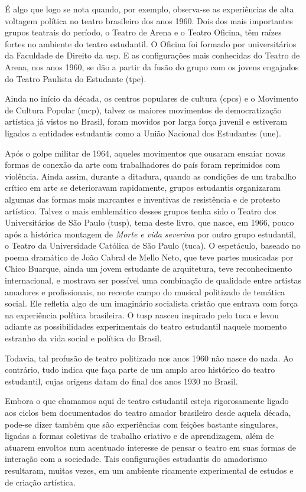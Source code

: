 É algo que logo se nota quando, por exemplo, observa-se as experiências
de alta voltagem política no teatro brasileiro dos anos 1960. Dois dos
mais importantes grupos teatrais do período, o Teatro de Arena e o
Teatro Oficina, têm raízes fortes no ambiente do teatro estudantil. O
Oficina foi formado por universitários da Faculdade de Direito da {\sc usp}. E
as configurações mais conhecidas do Teatro de Arena, nos anos 1960, se
dão a partir da fusão do grupo com os jovens engajados do Teatro
Paulista do Estudante ({\sc tpe}).

Ainda no início da década, os centros populares de cultura ({\sc cpc}s) e o
Movimento de Cultura Popular ({\sc mcp}), talvez os maiores movimentos de
democratização artística já vistos no Brasil, foram movidos por larga
força juvenil e estiveram ligados a entidades estudantis como a União
Nacional dos Estudantes ({\sc une}).

Após o golpe militar de 1964, aqueles movimentos que ousaram ensaiar
novas formas de conexão da arte com trabalhadores do país foram
reprimidos com violência. Ainda assim, durante a ditadura, quando as
condições de um trabalho crítico em arte se deterioravam rapidamente,
grupos estudantis organizaram algumas das formas mais marcantes e
inventivas de resistência e de protesto artístico. Talvez o mais
emblemático desses grupos tenha sido o Teatro dos Universitários de São
Paulo ({\sc tusp}), tema deste livro, que nasce, em 1966, pouco após a
histórica montagem de {\it Morte e vida severina} por outro grupo
estudantil, o Teatro da Universidade Católica de São Paulo ({\sc tuca}). O
espetáculo, baseado no poema dramático de João Cabral de Mello Neto, que
teve partes musicadas por Chico Buarque, ainda um jovem estudante de
arquitetura, teve reconhecimento internacional, e mostrava ser possível
uma combinação de qualidade entre artistas amadores e profissionais, no
recente campo do musical politizado de temática social. Ele refletia
algo de um imaginário socialista cristão que entrava com força na
experiência política brasileira. O {\sc tusp} nasceu inspirado pelo {\sc tuca} e
levou adiante as possibilidades experimentais do teatro estudantil
naquele momento estranho da vida social e política do Brasil.

Todavia, tal profusão de teatro politizado nos anos 1960 não nasce do
nada. Ao contrário, tudo indica que faça parte de um amplo arco
histórico do teatro estudantil, cujas origens datam do final dos anos
1930 no Brasil.

Embora o que chamamos aqui de teatro estudantil esteja rigorosamente
ligado aos ciclos bem documentados do teatro amador brasileiro desde
aquela década, pode-se dizer também que são experiências com feições
bastante singulares, ligadas a formas coletivas de trabalho criativo e
de aprendizagem, além de atuarem envoltos num acentuado interesse de
pensar o teatro em suas formas de interação com a sociedade. Tais
configurações estudantis do amadorismo resultaram, muitas vezes, em um
ambiente ricamente experimental de estudos e de criação artística.

